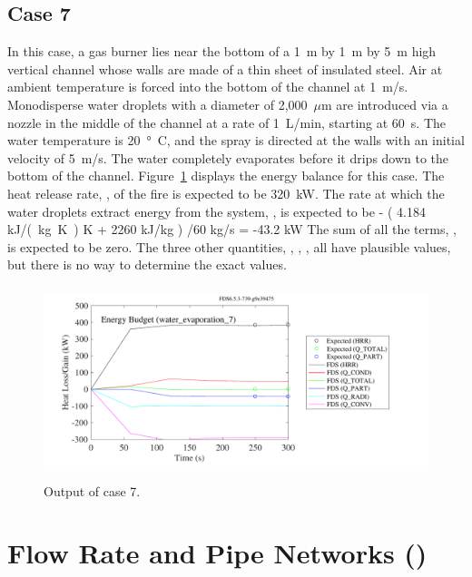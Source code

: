 \documentclass[11pt]{book}
\begin{document}
\subsection{Case 7}

In this case, a gas burner lies near the bottom of a 1~m by 1~m by 5~m high vertical channel whose walls are made of a thin sheet of insulated steel. Air at ambient temperature is forced into the bottom of the channel at 1~m/s. Monodisperse water droplets with a diameter of 2,000~$\mu$m are
introduced via a nozzle in the middle of the channel at a rate of 1~L/min, starting at 60~s. The water temperature is 20~\si{\degree C}, and the spray is directed at the walls with an initial velocity of 5~m/s.
The water completely evaporates before it drips down to the bottom of the channel.
Figure~\ref{water_evaporation_7_plot} displays the energy balance for this case. The heat release rate, , of the fire is expected to be 320~kW. The rate at which the water droplets extract energy from the system, , is expected to be
\be - \left( 4.184 \; \hbox{\si{kJ/(kg.K)}}  \; \hbox{K} + 2260 \; \hbox{kJ/kg} \right) /60 \; \hbox{kg/s} = -43.2 \; \hbox{kW} \ee
The sum of all the terms, , is expected to be zero. The three other quantities, , , , all have plausible values, but there is no way to determine the exact values.

\begin{figure}[h!]
\begin{center}
\includegraphics[height=2.2in]{SCRIPT_FIGURES/water_evaporation_7}
\end{center}
\caption[Sample case ]{Output of  case 7.}
\label{water_evaporation_7_plot}
\end{figure}



\clearpage

\section{Flow Rate and Pipe Networks (\texorpdfstring{{}}{flow\_rate\_2}) }
\end{document}
